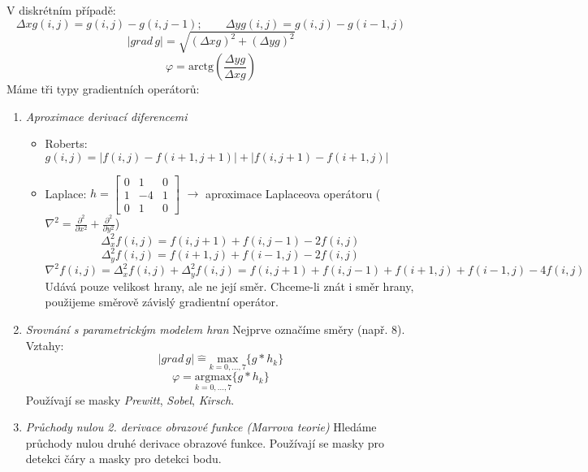 V diskrétním případě:
\begin{equation}
\Delta xg(i,j) = g(i, j) - g(i,j-1); \qquad \Delta yg(i,j) = g(i, j) - g(i-1,j)
\end{equation}
\begin{equation}
|grad \, g| = \sqrt{(\Delta xg)^2 + (\Delta yg)^2}
\end{equation}
\begin{equation}
\varphi = \mathrm{arctg} \left( \frac{\Delta yg}{\Delta xg} \right)
\end{equation}
Máme tři typy gradientních operátorů:
\begin{enumerate}
\item \textit{Aproximace derivací diferencemi}
\begin{itemize}
\item Roberts: $ g(i,j) = |f(i,j)-f(i+1,j+1)| + |f(i,j+1)-f(i+1,j)| $
\item Laplace: $ h = \begin{bmatrix}
0 & 1 & 0 \\ 1 & -4 & 1 \\ 0 & 1 & 0
\end{bmatrix} $
$ \to $ aproximace Laplaceova operátoru ($ \nabla^2 = \frac{\partial^2}{\partial x^2} + \frac{\partial^2}{\partial y^2} $)
\begin{equation}
\Delta_x^2 f(i,j) = f(i,j+1) + f(i,j-1) - 2f(i,j)
\end{equation}
\begin{equation}
\Delta_y^2 f(i,j) = f(i+1,j) + f(i-1,j) - 2f(i,j)
\end{equation}
\begin{equation*}
\nabla^2 f(i,j) = \Delta_x^2 f(i,j) + \Delta_y^2 f(i,j) = f(i,j+1) + f(i,j-1) + f(i+1,j) + f(i-1,j) - 4f(i,j)
\end{equation*}
Udává pouze velikost hrany, ale ne její směr. Chceme-li znát i směr hrany, použijeme směrově závislý gradientní operátor.
\end{itemize}
\item \textit{Srovnání s parametrickým modelem hran}
Nejprve označíme směry (např. 8). Vztahy:
\begin{equation}
|grad \, g| \hat{=} \underset{k=0,...,7}{\mathrm{max}}\{ g * h_k \}
\end{equation}
\begin{equation}
\varphi = \underset{k=0,...,7}{\mathrm{argmax}}\{ g * h_k \}
\end{equation}
Používají se masky \textit{Prewitt}, \textit{Sobel}, \textit{Kirsch}.

\item \textit{Průchody nulou 2. derivace obrazové funkce (Marrova teorie)}
Hledáme průchody nulou druhé derivace obrazové funkce. Používají se masky pro detekci čáry a masky pro detekci bodu.
\vspace{3cm}
\end{enumerate}

